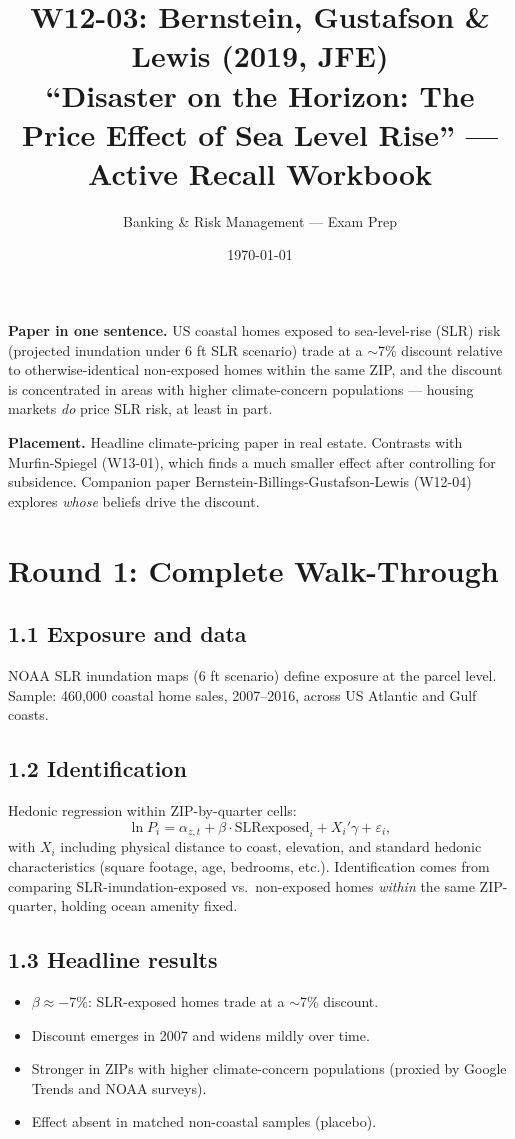 \documentclass[11pt]{article}
\title{W12-03: Bernstein, Gustafson \& Lewis (2019, JFE) \\
\large ``Disaster on the Horizon: The Price Effect of Sea Level Rise'' --- Active Recall Workbook}
\author{Banking \& Risk Management --- Exam Prep}
\date{\today}
\begin{document}
\maketitle

\begin{keybox}
\textbf{Paper in one sentence.} US coastal homes exposed to sea-level-rise (SLR) risk (projected inundation under 6 ft SLR scenario) trade at a $\sim$7\% discount relative to otherwise-identical non-exposed homes within the same ZIP, and the discount is concentrated in areas with higher climate-concern populations --- housing markets \emph{do} price SLR risk, at least in part.

\textbf{Placement.} Headline climate-pricing paper in real estate. Contrasts with Murfin-Spiegel (W13-01), which finds a much smaller effect after controlling for subsidence. Companion paper Bernstein-Billings-Gustafson-Lewis (W12-04) explores \emph{whose} beliefs drive the discount.
\end{keybox}

\section*{Round 1: Complete Walk-Through}

\subsection*{1.1 Exposure and data}
NOAA SLR inundation maps (6 ft scenario) define exposure at the parcel level. Sample: 460{,}000 coastal home sales, 2007--2016, across US Atlantic and Gulf coasts.

\subsection*{1.2 Identification}
Hedonic regression within ZIP-by-quarter cells:
\[
\ln P_i=\alpha_{z,t}+\beta\cdot\text{SLRexposed}_i+X_i'\gamma+\varepsilon_i,
\]
with $X_i$ including physical distance to coast, elevation, and standard hedonic characteristics (square footage, age, bedrooms, etc.). Identification comes from comparing SLR-inundation-exposed vs.\ non-exposed homes \emph{within} the same ZIP-quarter, holding ocean amenity fixed.

\subsection*{1.3 Headline results}
\begin{itemize}
\item $\beta\approx -7\%$: SLR-exposed homes trade at a $\sim$7\% discount.
\item Discount emerges in 2007 and widens mildly over time.
\item Stronger in ZIPs with higher climate-concern populations (proxied by Google Trends and NOAA surveys).
\item Effect absent in matched non-coastal samples (placebo).
\end{itemize}
\end{document}
